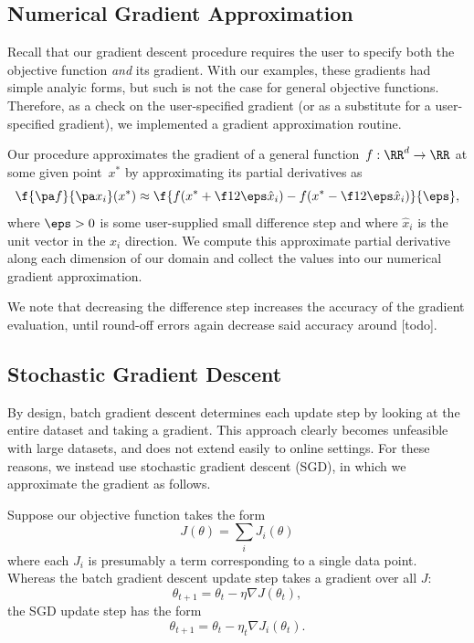 \documentclass{article}
\begin{document}
\begin{multicols}{2}
\subsection{Numerical Gradient Approximation}
\label{subsec:grad-approx}

Recall that our gradient descent procedure requires the user to specify both the objective function \emph{and} its gradient. With our examples, these gradients had simple analyic forms, but such is not the case for general objective functions. Therefore, as a check on the user-specified gradient (or as a substitute for a user-specified gradient), we implemented a gradient approximation routine.

Our procedure approximates the gradient of a general function~$f:\RR^d\to\RR$ at some given point~$x^*$ by approximating its partial derivatives as
\begin{equation}
\label{eq:grad-approx}
\f{\pa f}{\pa x_i}(x^*) \approx \f{f(x^* + \f12\eps\hat x_i) - f(x^* - \f12 \eps\hat x_i)}{\eps},
\end{equation}
where $\eps > 0$ is some user-supplied small difference step and where $\hat x_i$ is the unit vector in the $x_i$ direction. We compute this approximate partial derivative along each dimension of our domain and collect the values into our numerical gradient approximation. 


We note that decreasing the difference step increases the accuracy of the gradient evaluation, until round-off errors again decrease said accuracy around [todo].

\subsection{Stochastic Gradient Descent}

By design, batch gradient descent determines each update step by looking at the entire dataset and taking a gradient. This approach clearly becomes unfeasible with large datasets, and does not extend easily to online settings. For these reasons, we instead use stochastic gradient descent (SGD), in which we approximate the gradient as follows.

Suppose our objective function takes the form
\begin{equation}
J(\theta) = \sum_i J_i(\theta)
\end{equation}
where each $J_i$ is presumably a term corresponding to a single data point. Whereas the batch gradient descent update step takes a gradient over all $J$:
\begin{equation}
\theta_{t+1} = \theta_t - \eta \nabla J(\theta_t),
\end{equation}
the SGD update step has the form
\begin{equation} \theta_{t+1} = \theta_t - \eta_t \nabla J_i(\theta_t). \end{equation}


\end{multicols}
\end{document}
